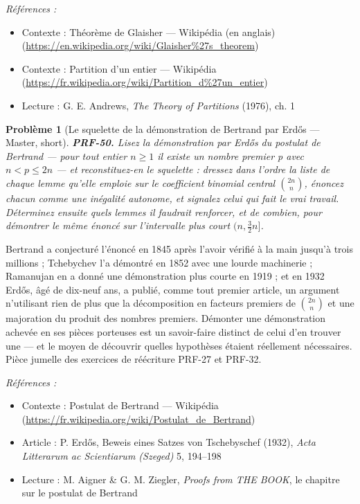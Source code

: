 \documentclass[11pt]{article}
\newtheorem{problem}{Problème}
\newenvironment{refs}{\par\small\noindent\emph{Références :}\begin{itemize}\setlength\itemsep{0pt}}{\end{itemize}\normalsize}
\begin{document}
\begin{refs}
\item Contexte : Théorème de Glaisher --- Wikipédia (en anglais) (\url{https://en.wikipedia.org/wiki/Glaisher%27s_theorem})
\item Contexte : Partition d'un entier --- Wikipédia (\url{https://fr.wikipedia.org/wiki/Partition_d%27un_entier})
\item Lecture : G. E. Andrews, \textit{The Theory of Partitions} (1976), ch. 1
\end{refs}

\bigskip

\begin{problem}[{Le squelette de la démonstration de Bertrand par Erd\H{o}s --- Master, short}]
\textbf{PRF-50.} Lisez la démonstration par Erd\H{o}s du postulat de
Bertrand --- pour tout entier $ n \ge 1 $ il existe un nombre premier p avec
$ n <p \le 2n $ --- et reconstituez-en le squelette : dressez dans l'ordre la liste de
chaque lemme qu'elle emploie sur le coefficient binomial central $ \binom{2n}{n} $,
énoncez chacun comme une inégalité autonome, et signalez celui qui fait le vrai travail.
Déterminez ensuite quels lemmes il faudrait renforcer, et de combien, pour démontrer le même
énoncé sur l'intervalle plus court $ (n, \tfrac{3}{2}n] $.
\end{problem}

\noindent Bertrand a conjecturé l'énoncé en 1845 après l'avoir vérifié à la main
jusqu'à trois millions ; Tchebychev l'a démontré en 1852 avec une lourde machinerie ;
Ramanujan en a donné une démonstration plus courte en 1919 ; et en 1932 Erd\H{o}s, âgé de
dix-neuf ans, a publié, comme tout premier article, un argument n'utilisant rien de plus que
la décomposition en facteurs premiers de $ \binom{2n}{n} $ et une majoration du produit des
nombres premiers. Démonter une démonstration achevée en ses pièces porteuses est un
savoir-faire distinct de celui d'en trouver une --- et le moyen de découvrir quelles hypothèses
étaient réellement nécessaires. Pièce jumelle des exercices de réécriture PRF-27 et
PRF-32.

\begin{refs}
\item Contexte : Postulat de Bertrand --- Wikipédia (\url{https://fr.wikipedia.org/wiki/Postulat_de_Bertrand})
\item Article : P. Erd\H{o}s, \og{} Beweis eines Satzes von Tschebyschef \fg{} (1932), \textit{Acta Litterarum ac Scientiarum (Szeged)} 5, 194--198
\item Lecture : M. Aigner \& G. M. Ziegler, \textit{Proofs from THE BOOK}, le chapitre sur le postulat de Bertrand
\end{refs}
\end{document}
